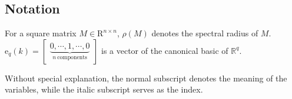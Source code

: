 \documentclass[letterpaper, 10pt, conference]{ieeeconf}  %
\begin{document}









\subsection{Notation}\label{sec_notation}
For a square matrix $M \in \mathrm{R}^{n \times n}$, $\rho (M)$ denotes the spectral radius of $M$. 
$\text{e}_{q}(k) = \begin{bmatrix}
    \underbrace{0, \cdots , {1} , \cdots , 0}_{n \ \text{components}} 
\end{bmatrix}$ is a vector of the canonical basic of $\mathbb{R}^{q}$.



Without special explanation, the normal subscript denotes the meaning of the variables, while the italic subscript serves as the index.
\end{document}
